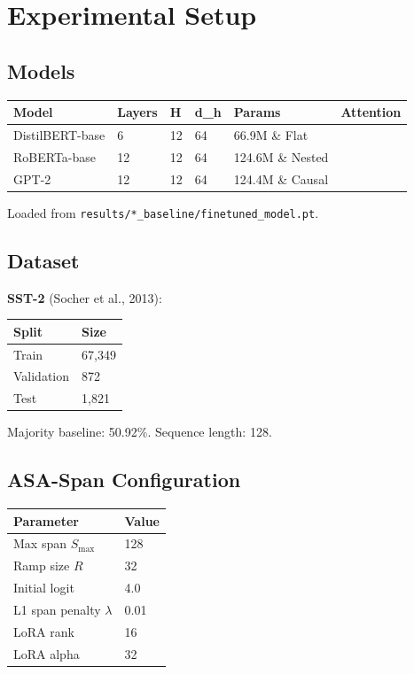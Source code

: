 
\section{Experimental Setup}

\subsection{Models}

\begin{table}[H]
\centering
\small
\begin{tabular}{llllll}
\toprule
\textbf{Model} & \textbf{Layers} & \textbf{H} & \textbf{d\_h} & \textbf{Params} & \textbf{Attention} \\
\midrule
DistilBERT-base & 6 & 12 & 64 & 66.9M \& Flat \\
RoBERTa-base & 12 & 12 & 64 & 124.6M \& Nested \\
GPT-2 & 12 & 12 & 64 & 124.4M \& Causal \\
\bottomrule
\end{tabular}
\end{table}

Loaded from \texttt{results/*\_baseline/finetuned\_model.pt}.

\subsection{Dataset}

\textbf{SST-2} (Socher et al., 2013):

\begin{table}[H]
\centering
\small
\begin{tabular}{ll}
\toprule
\textbf{Split} & \textbf{Size} \\
\midrule
Train & 67,349 \\
Validation & 872 \\
Test & 1,821 \\
\bottomrule
\end{tabular}
\end{table}

Majority baseline: 50.92\%. Sequence length: 128.

\subsection{ASA-Span Configuration}

\begin{table}[H]
\centering
\small
\begin{tabular}{ll}
\toprule
\textbf{Parameter} & \textbf{Value} \\
\midrule
Max span $S_\text{max}$ & 128 \\
Ramp size $R$ & 32 \\
Initial logit & 4.0 \\
L1 span penalty $\lambda$ & 0.01 \\
LoRA rank & 16 \\
LoRA alpha & 32 \\
\bottomrule
\end{tabular}
\end{table}

